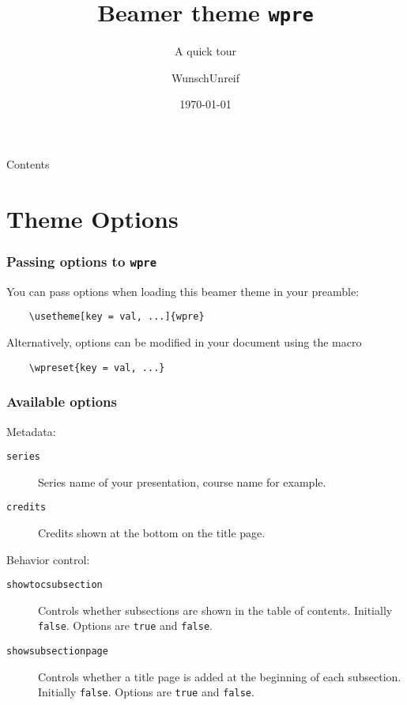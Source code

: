 \documentclass[no-math, aspectratio=1610, 10pt]{beamer}
\title{Beamer theme \texttt{wpre}}
\subtitle{A quick tour}
\author{WunschUnreif}
\institute{Basics, SJTU}
\date{\today}
\begin{document}
    \maketitle

    \begin{frame}{Contents}
        \tableofcontents
    \end{frame}

    \section{Theme Options}

    \begin{frame}[fragile]
        \frametitle{Passing options to \texttt{wpre}}
        You can pass options when loading this beamer theme in your preamble:
        \begin{verbatim}
    \usetheme[key = val, ...]{wpre}
        \end{verbatim}
        Alternatively, options can be modified in your document using the macro 
        \begin{verbatim}
    \wpreset{key = val, ...}
        \end{verbatim}
    \end{frame}

    \begin{frame}
        \frametitle{Available options}
    
        Metadata:
        \begin{description}
            \item[\texttt{series}] Series name of your presentation, course name for example.
            \item[\texttt{credits}] Credits shown at the bottom on the title page. 
        \end{description}

        Behavior control:
        \begin{description}
            \item[\texttt{showtocsubsection}] Controls whether subsections are shown in the table of contents. Initially \texttt{false}. Options are \texttt{true} and \texttt{false}.
            \item[\texttt{showsubsectionpage}] Controls whether a title page is added at the beginning of each subsection. Initially \texttt{false}. Options are \texttt{true} and \texttt{false}.
        \end{description}
    
    \end{frame}
\end{document}
